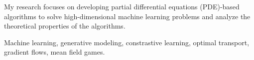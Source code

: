 

\begin{cvparagraph}


My research focuses on developing partial differential equations (PDE)-based algorithms to solve high-dimensional machine learning problems and analyze the theoretical properties of the algorithms.

Machine learning, generative modeling, constrastive learning, optimal transport, gradient flows, mean field games.

\end{cvparagraph}